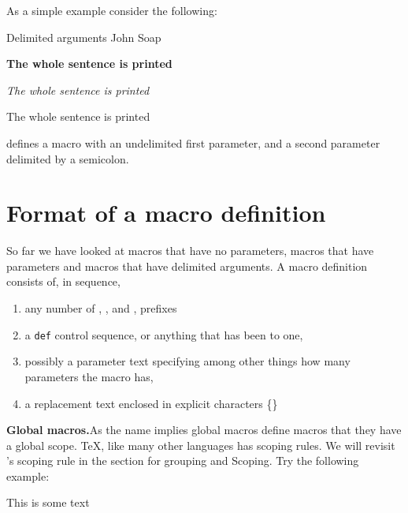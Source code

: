 As a simple example consider the following:

\bgroup
\let\bye\relax
\begin{texexample}{Delimited arguments}{}
\def\asentence#1#2;{{#1#2}}
\asentence John Soap;

\asentence \bfseries The whole sentence is printed;\par
\asentence \itshape The whole sentence is printed;\par
\asentence \ttfamily The whole sentence is printed;\par
\end{texexample}
\egroup

\noindent defines a macro with an undelimited first parameter, and a second parameter delimited by a
semicolon.

\section{Format of a macro definition}

So far we have looked at macros that have no parameters, macros that have parameters and macros that have delimited arguments. A macro definition consists of, in sequence,
\begin{enumerate}
\item any number of , , and , prefixes
\item a \texttt{def} control sequence, or anything that has been  to one,
\item possibly a parameter text specifying among other things how many parameters the macro has,
\item a replacement text enclosed in explicit characters \{\}
\end{enumerate}

\begin{multicols}{2}
\textbf{Global macros.}\quad As the name implies global macros define macros that they have a global scope. TeX, like many other languages has scoping rules. We will revisit \tex's scoping rule in the section for grouping and Scoping.  Try the following example:
\end{multicols}

\begin{teX}
\def\sometext{This is some text}
\def\someothertext{%
   \def\sometext{I am in the macro, someothertext.}\par
   \sometext
}
\sometext
\end{teX}


